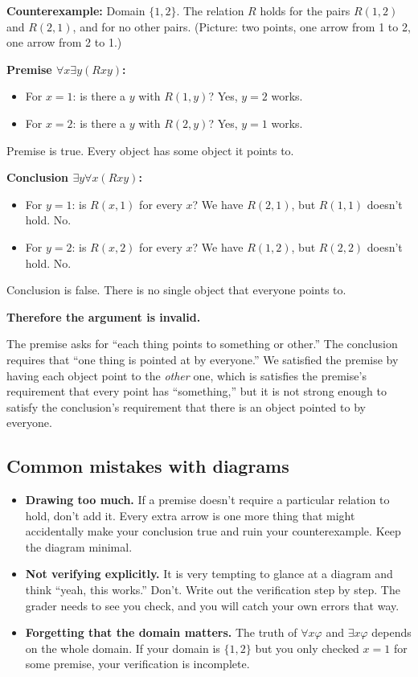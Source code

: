 \documentclass[11pt]{article}
\begin{document}
\begin{example}
\textbf{Counterexample:} Domain $\{1, 2\}$. The relation $R$ holds for the pairs $R(1,2)$ and $R(2,1)$, and for no other pairs. (Picture: two points, one arrow from 1 to 2, one arrow from 2 to 1.)

\textbf{Premise $\forall x \exists y(Rxy)$:}
\begin{itemize}[leftmargin=*]
    \item For $x = 1$: is there a $y$ with $R(1,y)$? Yes, $y = 2$ works. \checkmark
    \item For $x = 2$: is there a $y$ with $R(2,y)$? Yes, $y = 1$ works. \checkmark
\end{itemize}
Premise is true. Every object has some object it points to.

\textbf{Conclusion $\exists y \forall x(Rxy)$:}
\begin{itemize}[leftmargin=*]
    \item For $y = 1$: is $R(x,1)$ for every $x$? We have $R(2,1)$, but $R(1,1)$ doesn't hold. No. 
    \item For $y = 2$: is $R(x,2)$ for every $x$? We have $R(1,2)$, but $R(2,2)$ doesn't hold. No. 
\end{itemize}
Conclusion is false. There is no single object that everyone points to.

\textbf{Therefore the argument is invalid.}
\end{example}

The premise asks for ``each thing points to something or other.'' The conclusion requires that ``one thing is pointed at by everyone.'' We satisfied the premise by having each object point to the \emph{other} one, which is satisfies the premise's requirement that every point has ``something,'' but it is not strong enough to satisfy the conclusion's requirement that there is an object pointed to by everyone.

\subsection{Common mistakes with diagrams}

\begin{itemize}[leftmargin=*]
    \item \textbf{Drawing too much.} If a premise doesn't require a particular relation to hold, don't add it. Every extra arrow is one more thing that might accidentally make your conclusion true and ruin your counterexample. Keep the diagram minimal.
    \item \textbf{Not verifying explicitly.} It is very tempting to glance at a diagram and think ``yeah, this works.'' Don't. Write out the verification step by step. The grader needs to see you check, and you will catch your own errors that way.
    \item \textbf{Forgetting that the domain matters.} The truth of $\forall x \varphi$ and $\exists x \varphi$ depends on the whole domain. If your domain is $\{1, 2\}$ but you only checked $x = 1$ for some premise, your verification is incomplete.
\end{itemize}
\end{document}
